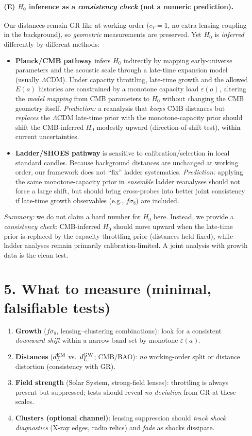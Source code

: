 \documentclass[aps,prd,onecolumn,superscriptaddress,nofootinbib]{revtex4-2}
\newcommand{\eps}{\varepsilon}
\begin{document}
\paragraph*{(E) $H_0$ inference as a \emph{consistency check} (not a numeric prediction).}
Our distances remain GR-like at working order ($c_T=1$, no extra lensing coupling in the background), so \emph{geometric} measurements are preserved. Yet $H_0$ is \emph{inferred} differently by different methods:
\begin{itemize}
\item \textbf{Planck/CMB pathway} infers $H_0$ indirectly by mapping early-universe parameters and the acoustic scale through a late-time expansion model (usually $\Lambda$CDM). Under capacity throttling, late-time growth and the allowed $E(a)$ histories are constrained by a monotone capacity load $\varepsilon(a)$, altering the \emph{model mapping} from CMB parameters to $H_0$ without changing the CMB geometry itself. \emph{Prediction:} a reanalysis that \emph{keeps} CMB distances but \emph{replaces} the $\Lambda$CDM late-time prior with the monotone-capacity prior should shift the CMB-inferred $H_0$ modestly upward (direction-of-shift test), within current uncertainties.
\item \textbf{Ladder/SHOES pathway} is sensitive to calibration/selection in local standard candles. Because background distances are unchanged at working order, our framework does not “fix” ladder systematics. \emph{Prediction:} applying the same monotone-capacity prior in \emph{ensemble} ladder reanalyses should not force a large shift, but should bring cross-probes into better joint consistency if late-time growth observables (e.g., $f\sigma_8$) are included.
\end{itemize}
\emph{Summary:} we do not claim a hard number for $H_0$ here. Instead, we provide a \emph{consistency check}: CMB-inferred $H_0$ should move upward when the late-time prior is replaced by the capacity-throttling prior (distances held fixed), while ladder analyses remain primarily calibration-limited. A joint analysis with growth data is the clean test.

\section*{5. What to measure (minimal, falsifiable tests)}
\begin{enumerate}
\item \textbf{Growth} ($f\sigma_8$, lensing--clustering combinations): look for a consistent \emph{downward shift} within a narrow band set by monotone $\eps(a)$.
\item \textbf{Distances} ($d_L^{\rm EM}$ vs.\ $d_L^{\rm GW}$; CMB/BAO): \emph{no} working-order split or distance distortion (consistency with GR).
\item \textbf{Field strength} (Solar System, strong-field lenses): throttling is always present but suppressed; tests should reveal \emph{no deviation} from GR at these scales.
\item \textbf{Clusters (optional channel)}: lensing suppression should \emph{track shock diagnostics} (X-ray edges, radio relics) and \emph{fade} as shocks dissipate.
\end{enumerate}
\end{document}
